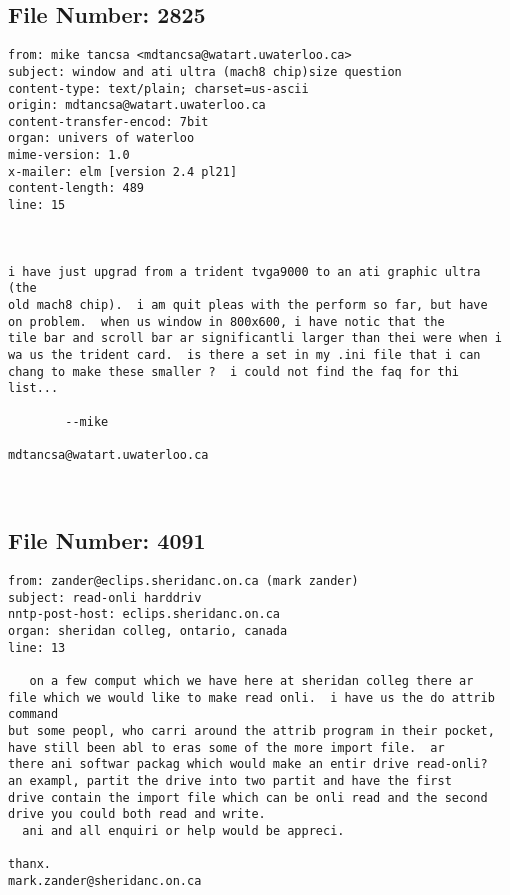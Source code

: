 \subsection{File Number: 2825}
\begin{verbatim}
from: mike tancsa <mdtancsa@watart.uwaterloo.ca>
subject: window and ati ultra (mach8 chip)size question
content-type: text/plain; charset=us-ascii
origin: mdtancsa@watart.uwaterloo.ca
content-transfer-encod: 7bit
organ: univers of waterloo
mime-version: 1.0
x-mailer: elm [version 2.4 pl21]
content-length: 489       
line: 15



i have just upgrad from a trident tvga9000 to an ati graphic ultra (the
old mach8 chip).  i am quit pleas with the perform so far, but have
on problem.  when us window in 800x600, i have notic that the 
tile bar and scroll bar ar significantli larger than thei were when i
wa us the trident card.  is there a set in my .ini file that i can
chang to make these smaller ?  i could not find the faq for thi list...

		--mike

mdtancsa@watart.uwaterloo.ca



\end{verbatim}
\subsection{File Number: 4091}
\begin{verbatim}
from: zander@eclips.sheridanc.on.ca (mark zander)
subject: read-onli harddriv
nntp-post-host: eclips.sheridanc.on.ca
organ: sheridan colleg, ontario, canada
line: 13

   on a few comput which we have here at sheridan colleg there ar
file which we would like to make read onli.  i have us the do attrib command
but some peopl, who carri around the attrib program in their pocket,
have still been abl to eras some of the more import file.  ar
there ani softwar packag which would make an entir drive read-onli?
an exampl, partit the drive into two partit and have the first
drive contain the import file which can be onli read and the second
drive you could both read and write.  
  ani and all enquiri or help would be appreci.

thanx.
mark.zander@sheridanc.on.ca
 
\end{verbatim}
